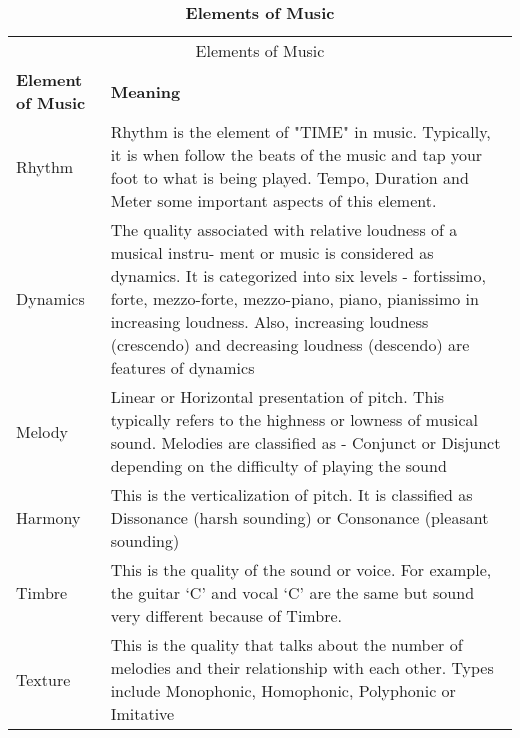 \renewcommand{\arraystretch}{2}
\centering
\setlength{\arrayrulewidth}{0.3mm}
\begin{table}[H]
\small
\begin{center}
\begin{tabular}{ | p{2cm}| p{11cm}| }
\multicolumn{2}{c}{Elements of Music \cite{martineau2021elements}} \\
\cline{1-2}
\textbf{Element of Music} & \textbf{Meaning} \\
\hline  \hline
Rhythm          &  Rhythm is the element of "TIME" in music. Typically, it is when follow the beats of the music and tap your foot to what is being played. Tempo, Duration and Meter some important aspects of this element.  \\
\hline
Dynamics        &  The quality associated with relative loudness of a musical instru-
ment or music is considered as dynamics. It is categorized into six levels -  fortissimo, forte, mezzo-forte, mezzo-piano, piano, pianissimo in increasing loudness.  Also, increasing loudness (crescendo) and decreasing loudness (descendo) are features of dynamics  \\
\hline
Melody          & Linear or Horizontal presentation of pitch. This typically refers to the highness or lowness of musical sound. Melodies are classified as - Conjunct or Disjunct depending on the difficulty of playing the sound \\
\hline
Harmony         &        This is the verticalization of pitch. It is classified as  Dissonance  (harsh sounding) or Consonance (pleasant sounding) \\
\hline
Timbre          &         This is the quality of the sound or voice. For example, the guitar ‘C’ and vocal ‘C’ are the same but sound very different because of Timbre.                                \\
\hline
Texture        &       This is the quality that talks about the number of melodies and their relationship with each other. Types include  Monophonic, Homophonic, Polyphonic or Imitative  \\
 \hline  \hline
\end{tabular}
\caption{\label{elements-of-music} \textbf{Elements of Music}}
\end{center}
\end{table}

